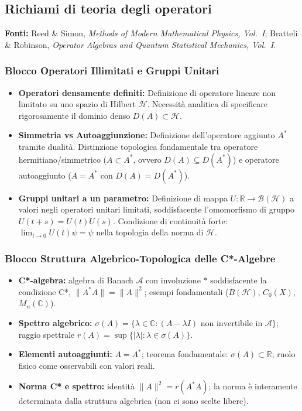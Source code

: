 \documentclass[12pt, a4paper]{article}
\newcommand{\fonti}[1]{%
	\begin{fontebox}
		\textcolor{fontecolor}{\footnotesize\textbf{Fonti:} #1}
	\end{fontebox}%
}
\begin{document}
	\subsection{Richiami di teoria degli operatori}
	
	\fonti{Reed \& Simon, \textit{Methods of Modern Mathematical Physics, Vol.~I}; Bratteli \& Robinson, \textit{Operator Algebras and Quantum Statistical Mechanics, Vol.~I}.}
	
	\subsubsection{Blocco Operatori Illimitati e Gruppi Unitari}
	\begin{itemize}
		\item \textbf{Operatori densamente definiti:} Definizione di operatore lineare non limitato su uno spazio di Hilbert $\mathcal{H}$. Necessità analitica di specificare rigorosamente il dominio denso $D(A) \subset \mathcal{H}$.
		\item \textbf{Simmetria vs Autoaggiunzione:} Definizione dell'operatore aggiunto $A^*$ tramite dualità. Distinzione topologica fondamentale tra operatore hermitiano/simmetrico ($A \subset A^*$, ovvero $D(A) \subseteq D(A^*)$) e operatore autoaggiunto ($A = A^*$ con $D(A) = D(A^*)$).
		\item \textbf{Gruppi unitari a un parametro:} Definizione di mappa $U: \mathbb{R} \to \mathcal{B}(\mathcal{H})$ a valori negli operatori unitari limitati, soddisfacente l'omomorfismo di gruppo $U(t+s) = U(t)U(s)$. Condizione di continuità forte: $\lim_{t \to 0} U(t)\psi = \psi$ nella topologia della norma di $\mathcal{H}$.
	\end{itemize}
	
	\subsubsection{Blocco Struttura Algebrico-Topologica delle C*-Algebre}
		\begin{itemize}
			\item \textbf{C*-algebra:} algebra di Banach $\mathcal{A}$ con involuzione $*$ soddisfacente la condizione C*, $\|A^*A\| = \|A\|^2$; esempi fondamentali ($B(\mathcal{H})$, $C_0(X)$, $M_n(\mathbb{C})$).
			\item \textbf{Spettro algebrico:} $\sigma(A) = \{\lambda \in \mathbb{C} : (A - \lambda I) \text{ non invertibile in } \mathcal{A}\}$; raggio spettrale $r(A) = \sup\{|\lambda| : \lambda \in \sigma(A)\}$.
			\item \textbf{Elementi autoaggiunti:} $A = A^*$; teorema fondamentale: $\sigma(A) \subset \mathbb{R}$; ruolo fisico come osservabili con valori reali.
			\item \textbf{Norma C* e spettro:} identità $\|A\|^2 = r(A^*A)$; la norma è interamente determinata dalla struttura algebrica (non ci sono scelte libere).
		\end{itemize}
	
\end{document}
